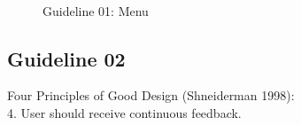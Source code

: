 \documentclass{article}
\begin{document}
\begin{figure}[H]
  \centering

%
\qquad
    \qquad
     \\
    \caption{Guideline 01: Menu}%
\end{figure}

\subsection{Guideline 02}
Four Principles of Good Design (Shneiderman 1998):\\
4. User should receive continuous feedback. \\
\end{document}

